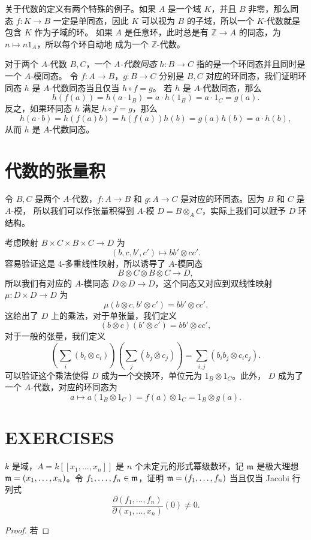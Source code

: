 关于代数的定义有两个特殊的例子。如果 $A$ 是一个域 $K$，并且 $B$ 非零，那么同态 $f:K\to B$
一定是单同态，因此 $K$ 可以视为 $B$ 的子域，所以一个 $K$-代数就是包含 $K$ 作为子域的环。
如果 $A$ 是任意环，此时总是有 $\mathbb{Z}\to A$ 的同态，为 $n\mapsto n1_A$，所以每个环自动地
成为一个 $\mathbb{Z}$-代数。

对于两个 $A$-代数 $B,C$，一个 \emph{$A$-代数同态} $h:B\to C$ 指的是一个环同态并且同时是一个 $A$-模同态。
令 $f:A\to B$，$g:B\to C$ 分别是 $B,C$ 对应的环同态，我们证明环同态 $h$ 是 $A$-代数同态当且仅当 $h\circ f=g$。
若 $h$ 是 $A$-代数同态，那么
\[
  h(f(a))= h(a\cdot 1_B)=a\cdot h(1_B)=a\cdot 1_C=g(a).
\]
反之，如果环同态 $h$ 满足 $h\circ f=g$，那么
\[
  h(a\cdot b)=h(f(a)b)=h(f(a))h(b)=g(a)h(b)=a\cdot h(b), 
\]
从而 $h$ 是 $A$-代数同态。

\section{代数的张量积}

令 $B,C$ 是两个 $A$-代数，$f:A\to B$ 和 $g:A\to C$ 是对应的环同态。因为 $B$ 和 $C$ 是 $A$-模，
所以我们可以作张量积得到 $A$-模 $D=B\otimes_A C$，实际上我们可以赋予 $D$ 环结构。

考虑映射 $B\times C\times B\times C\to D$ 为
\[
  (b,c,b',c')\mapsto bb'\otimes cc'.  
\]
容易验证这是 $4$-多重线性映射，所以诱导了 $A$-模同态 
\[
  B\otimes C\otimes B\otimes C\to D,  
\]
所以我们有对应的 $A$-模同态 $D\otimes D\to D$，这个同态又对应到双线性映射
$
  \mu:D\times D\to D   
$
为
\[
  \mu(b\otimes c,b'\otimes c')=bb'\otimes cc'.  
\]
这给出了 $D$ 上的乘法，对于单张量，我们定义
\[
  (b\otimes c)(b'\otimes c')=bb'\otimes cc',  
\]
对于一般的张量，我们定义
\[
  \left(\sum_i (b_i\otimes c_i)\right) 
  \left(\sum_j(b_j\otimes c_j)\right)
  =\sum_{i,j}(b_ib_j\otimes c_ic_j).
\]
可以验证这个乘法使得 $D$ 成为一个交换环，单位元为 $1_B\otimes 1_C$。此外，
$D$ 成为了一个 $A$-代数，对应的环同态为 
\[
  a\mapsto a(1_B\otimes 1_C)=f(a)\otimes 1_C=1_B\otimes g(a).
\]


\section{EXERCISES}

\begin{problem}
  $k$ 是域，$A=k[[x_1,\dots,x_n]]$ 是 $n$ 个未定元的形式幂级数环，记
  $\mathfrak{m}$ 是极大理想 $\mathfrak{m}=(x_1,\dots,x_n)$。令
  $f_1,\dots,f_n\in \mathfrak{m}$，证明 $\mathfrak{m}=(f_1,\dots,f_n)$
  当且仅当 Jacobi 行列式
  \[
    \frac{\partial(f_1,\dots,f_n)}{\partial(x_1,\dots,x_n)}(0)\neq 0.  
  \]
\end{problem}
\begin{proof}
  若
\end{proof}

